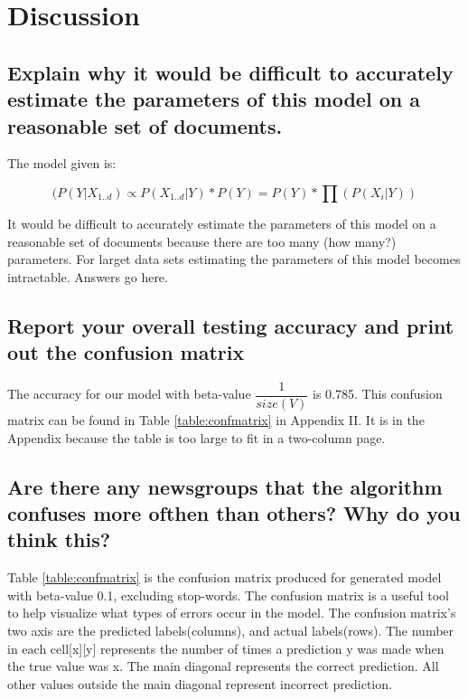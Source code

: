\documentclass{IEEEtran}
\begin{document}
\section{Discussion}

\subsection{Explain why it would be difficult to accurately estimate the parameters of this model on a reasonable set of documents.}
The model given is:

\begin{equation}
\label{entropy-equation}
(P(Y|X_{1..d}) \propto P(X_{1..d}|Y)*P(Y) = P(Y)*\prod(P(X_i|Y))
\end{equation}

It would be difficult to accurately estimate the parameters of this model on a reasonable set of documents because there are too many (how many?) parameters. For larget data sets estimating the parameters of this model becomes intractable.
Answers go here.


\subsection{Report your overall testing accuracy and print out the confusion matrix}
The accuracy for our model with beta-value $\dfrac{1}{size(V)}$ is 0.785. This confusion matrix can be found in Table \ref{table:confmatrix} in Appendix II. It is in the Appendix because the table is too large to fit in a two-column page.


\subsection{Are there any newsgroups that the algorithm confuses more ofthen than others? Why do you think this?}

Table \ref{table:confmatrix} is the confusion matrix produced for generated model with beta-value 0.1, excluding stop-words. The confusion matrix is a useful tool to help visualize what types of errors occur in the model. The confusion matrix's two axis are the predicted labels(columns), and actual labels(rows). The number in each cell[x][y] represents the number of times a prediction y was made when the true value was x. The main diagonal represents the correct prediction. All other values outside the main diagonal represent incorrect prediction.
\end{document}
